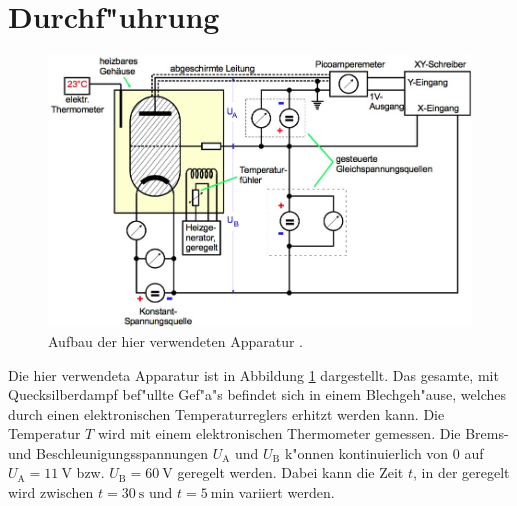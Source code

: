 \section{Durchf"uhrung}
\label{sec:durchfuehrung}
	\begin{figure}[h]
		\centering
		\includegraphics[width = 12cm]{img/aufbau-exakt.jpeg}
		\caption{Aufbau der hier verwendeten Apparatur \cite{anleitung}. \label{fig:aufbau-exakt}}
	\end{figure}

	Die hier verwendeta Apparatur ist in Abbildung \ref{fig:aufbau-exakt} dargestellt.
	Das gesamte, mit Quecksilberdampf bef"ullte Gef"a"s befindet sich in einem Blechgeh"ause, welches durch einen elektronischen Temperaturreglers erhitzt werden kann.
	Die Temperatur $T$ wird mit einem elektronischen Thermometer gemessen.
	Die Brems- und Beschleunigungsspannungen $U_\mathrm{A}$ und $U_\mathrm{B}$ k"onnen kontinuierlich von 0 auf $U_\mathrm{A} = \SI{11}{\volt}$ bzw. $U_\mathrm{B} = \SI{60}{\volt}$ geregelt werden.
	Dabei kann die Zeit $t$, in der geregelt wird zwischen $t = \SI{30}{\second}$ und $t = \SI{5}{\minute}$ variiert werden.

	